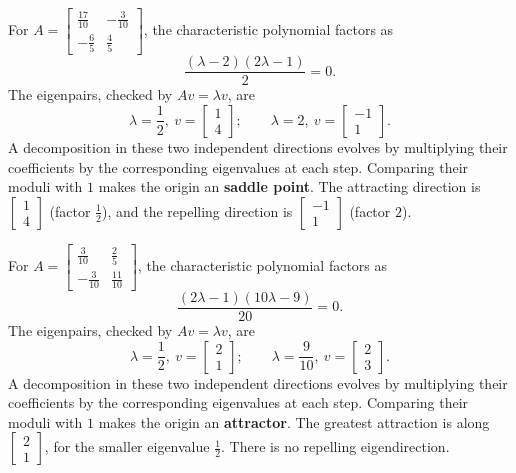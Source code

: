 For $A=\left[\begin{matrix}\frac{17}{10} & - \frac{3}{10}\\- \frac{6}{5} & \frac{4}{5}\end{matrix}\right]$, the characteristic polynomial factors as
\[\frac{\left(\lambda - 2\right) \left(2 \lambda - 1\right)}{2}=0.\]
The eigenpairs, checked by $Av=\lambda v$, are
\[\lambda=\frac{1}{2},\ v=\left[\begin{matrix}1\\4\end{matrix}\right];\qquad
\lambda=2,\ v=\left[\begin{matrix}-1\\1\end{matrix}\right].\]
A decomposition in these two independent directions evolves by
multiplying their coefficients by the corresponding eigenvalues at
each step. Comparing their moduli with $1$ makes the origin an
\textbf{saddle point}. The attracting direction is $\left[\begin{matrix}1\\4\end{matrix}\right]$ (factor $\frac{1}{2}$), and the repelling direction is $\left[\begin{matrix}-1\\1\end{matrix}\right]$ (factor $2$).

For $A=\left[\begin{matrix}\frac{3}{10} & \frac{2}{5}\\- \frac{3}{10} & \frac{11}{10}\end{matrix}\right]$, the characteristic polynomial factors as
\[\frac{\left(2 \lambda - 1\right) \left(10 \lambda - 9\right)}{20}=0.\]
The eigenpairs, checked by $Av=\lambda v$, are
\[\lambda=\frac{1}{2},\ v=\left[\begin{matrix}2\\1\end{matrix}\right];\qquad
\lambda=\frac{9}{10},\ v=\left[\begin{matrix}2\\3\end{matrix}\right].\]
A decomposition in these two independent directions evolves by
multiplying their coefficients by the corresponding eigenvalues at
each step. Comparing their moduli with $1$ makes the origin an
\textbf{attractor}. The greatest attraction is along $\left[\begin{matrix}2\\1\end{matrix}\right]$, for the smaller eigenvalue $\frac{1}{2}$. There is no repelling eigendirection.

